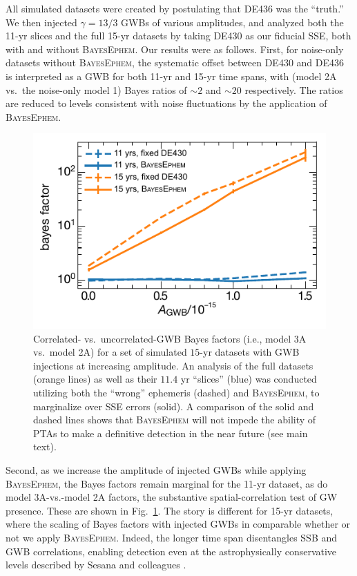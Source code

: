 \documentclass[iop,apj,twocolappendix]{emulateapj}
\begin{document}
All simulated datasets were created by postulating that DE436 was the ``truth.'' We then injected $\gamma = 13/3$ GWBs of various amplitudes, and analyzed both the 11-yr slices and the full 15-yr datasets by taking DE430 as our fiducial SSE, both with and without \textsc{BayesEphem}.
Our results were as follows.
First, for noise-only datasets without \textsc{BayesEphem}, the systematic offset between DE430 and DE436 is interpreted as a GWB for both 11-yr and 15-yr time spans, with (model 2A vs.\ the noise-only model 1) Bayes ratios of $\sim 2$ and $\sim 20$ respectively. The ratios are reduced to levels consistent with noise fluctuations by the application of \textsc{BayesEphem}.
%
\begin{figure}
    \includegraphics{figures/bayesephem_simulations.pdf}
    \caption{Correlated- vs.\ uncorrelated-GWB Bayes factors (i.e., model 3A vs.\ model 2A) for a set of simulated $15$-yr datasets with GWB injections at increasing amplitude. An analysis of the full datasets (orange lines) as well as their $11.4$ yr ``slices'' (blue) was conducted utilizing both the ``wrong'' ephemeris (dashed) and \textsc{BayesEphem}, to marginalize over SSE errors (solid). A comparison of the solid and dashed lines shows that \textsc{BayesEphem} will not impede the ability of PTAs to make a definitive detection in the near future (see main text).
    \label{fig:simulations}}
\end{figure}

Second, as we increase the amplitude of injected GWBs while applying \textsc{BayesEphem}, the Bayes factors remain marginal for the 11-yr dataset, as do model 3A-vs.-model 2A factors, the substantive spatial-correlation test of GW presence. These are shown in Fig.\ \ref{fig:simulations}.
The story is different for 15-yr datasets, where the scaling of Bayes factors with injected GWBs in comparable whether or not we apply \textsc{BayesEphem}. Indeed, the longer time span disentangles SSB and GWB correlations, enabling detection even at the astrophysically conservative levels described by Sesana and colleagues \citep{2016MNRAS.463L...6S}.
\end{document}
